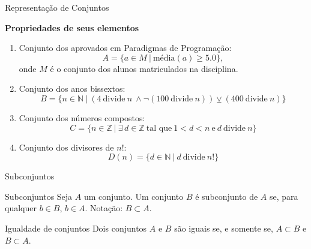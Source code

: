 \begin{frame}[fragile]{Representação de Conjuntos}

    \textbf{Propriedades de seus elementos}

    \vspace{0.1in}

    \begin{enumerate}

        \item Conjunto dos aprovados em Paradigmas de Programação:
        \[
            A = \lbrace a\in M\ |\ \mbox{média}(a) \geq 5.0 \rbrace,
        \]
        onde $M$ é o conjunto dos alunos matriculados na disciplina.

        \item Conjunto dos anos bissextos:
        \[
            B = \lbrace n\in\mathbb{N}\ |\ (4\ \mbox{divide}\ n\ \land \lnot(100\ \mbox{divide}\ 
            n)) \veebar (400\ \mbox{divide}\ n)\rbrace
        \]

        \item Conjunto dos números compostos:
        \[
            C = \lbrace n\in \mathbb{Z}\ |\ \exists\, d\in \mathbb{Z}\ \mbox{tal que}\ 1 < d < n\
                \mbox{e}\ d\ \mbox{divide}\ n\rbrace
        \]

        \item Conjunto dos divisores de $n!$:
        \[
            D(n) = \lbrace d\in \mathbb{N}\ |\ d\ \mbox{divide}\ n!\rbrace
        \]
    \end{enumerate}

\end{frame}

\begin{frame}[fragile]{Subconjuntos}

    \begin{block}{Subconjuntos}
        Seja $A$ um conjunto. Um conjunto $B$ é subconjunto de $A$ se, para qualquer $b\in B$, 
            $b\in A$. Notação: $B\subset A$.
    \end{block}

    \vspace{0.1in}

    \begin{block}{Igualdade de conjuntos}
       Dois conjuntos $A$ e $B$ são iguais se, e somente se, $A\subset B$ e $B\subset A$.
    \end{block}

\end{frame}

